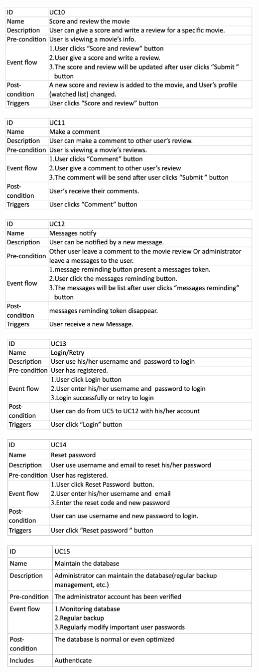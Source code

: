 \documentclass[12pt]{article}
\begin{document}
\includegraphics[width=1\linewidth]{UD4.png}\\\newpage
\includegraphics[width=1\linewidth]{UC4.png}\\\newpage
\end{document}
